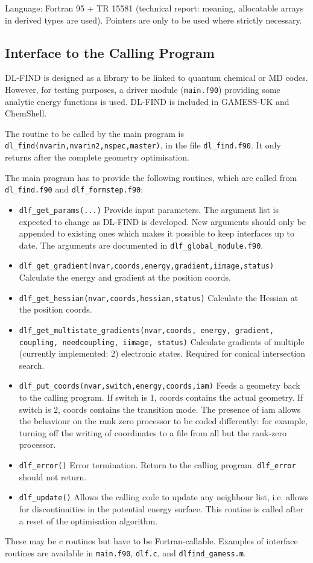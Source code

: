 \documentclass{article}
\begin{document}
Language: Fortran 95 + TR 15581 (technical report: meaning, allocatable arrays
in derived types are used). Pointers are only to be used where strictly
necessary.

\subsection{Interface to the Calling Program \label{sec:interface}}

DL-FIND is designed as a library to be linked to quantum chemical or MD codes.
However, for testing purposes, a driver module (\texttt{main.f90}) providing some
analytic energy functions is used. DL-FIND is included in GAMESS-UK and
ChemShell.

The routine to be called by the main program is
\texttt{dl\_find(nvarin,nvarin2,nspec,master)}, in the file \texttt{dl\_find.f90}. It
only returns after the complete geometry optimisation.

The main program has to provide the following routines, which are called from
\texttt{dl\_find.f90} and \texttt{dlf\_formstep.f90}:
\begin{itemize}
\item \texttt{dlf\_get\_params(...)} Provide input parameters. The argument
  list is expected to change as DL-FIND is developed. New arguments should
  only be appended to existing ones which makes it possible to keep interfaces
  up to date. The arguments are documented in \texttt{dlf\_global\_module.f90}.
\item \texttt{dlf\_get\_gradient(nvar,coords,energy,gradient,iimage,status)}
  Calculate the energy and gradient at the position coords.
\item \texttt{dlf\_get\_hessian(nvar,coords,hessian,status)} Calculate the
  Hessian at the position coords.
\item \texttt{dlf\_get\_multistate\_gradients(nvar,coords, energy, gradient,
    coupling, needcoupling, iimage, status)} Calculate gradients of multiple
    (currently implemented: 2) electronic states. Required for conical
    intersection search.
\item \texttt{dlf\_put\_coords(nvar,switch,energy,coords,iam)} Feeds a geometry
  back to the calling program. If switch is 1, coords contains the actual
  geometry. If switch is 2, coords contains the transition mode.
  The presence of iam allows the behaviour on the rank zero processor to be coded 
  differently: for 
  example, turning off the writing of coordinates to a file from all but the
  rank-zero processor.
\item \texttt{dlf\_error()} Error termination. Return to the calling
  program. \texttt{dlf\_error} should not return.
\item \texttt{dlf\_update()} Allows the calling code to update any neighbour
  list, i.e. allows for discontinuities in the potential energy surface. This
  routine is called after a reset of the optimisation algorithm.
\end{itemize}
These may be c routines but have to be Fortran-callable. Examples of interface
routines are available in \texttt{main.f90}, \texttt{dlf.c}, and
\texttt{dlfind\_gamess.m}.
\end{document}
